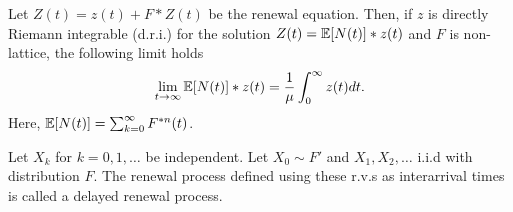 \documentclass[all-lectures.tex]{subfiles}
\begin{document}
\begin{thm}
Let $Z(t) = z(t) + F*Z(t)$ be the renewal equation. Then, if $z$ is directly Riemann integrable (d.r.i.) for the solution $Z(t) = \mathbb{E}[N(t)]*z(t)$ and $F$ is non-lattice, the following limit holds
\begin{align*}
\lim_{t\to \infty} \mathbb{E}[N(t)]*z(t) = \frac{1}{\mu} \int_0^\infty z(t) dt.
\end{align*}
Here, $\mathbb{E}[N(t)] = \sum_{k=0}^\infty F^{*n}(t)$.
\end{thm}

\begin{defn}
Let $X_k$ for $k = 0,1,\dots$ be independent. Let $X_0 \sim F'$  and $X_1,X_2,\dots$ i.i.d with distribution $F$. The renewal process defined using these r.v.s as interarrival times is called a delayed renewal process. 
\end{defn}
\end{document}
